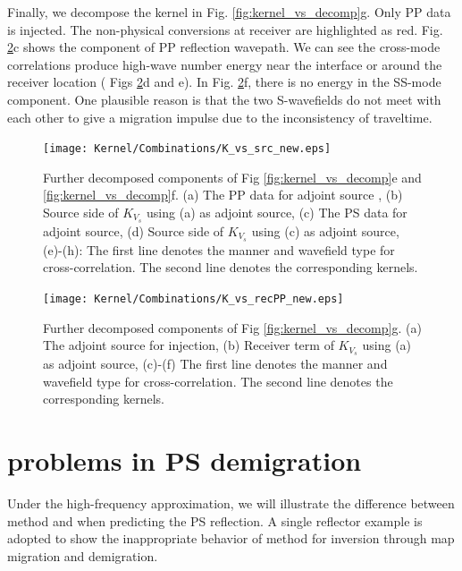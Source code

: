 \documentclass[extra,mreferee]{gji}
\newcommand{\Rome}[1]{{\bf\uppercase\expandafter{\romannumeral #1\relax}}}
\begin{document}
Finally, we decompose the kernel in Fig. \ref{fig:kernel_vs_decomp}g.
Only PP data is injected. The non-physical conversions at receiver are highlighted as red. 
Fig. \ref{fig:kernel_vs_recPP}c shows the component of PP reflection wavepath.
We can see the cross-mode correlations produce high-wave number energy near the interface or around the
receiver location ( Figs \ref{fig:kernel_vs_recPP}d and e).
In Fig. \ref{fig:kernel_vs_recPP}f,
there is no energy in the SS-mode component. One plausible reason is that the two S-wavefields do
not meet with each other to give a migration impulse due to the inconsistency of traveltime. 
\begin{figure}[!htb]
   \centering
   {\texttt{[image: Kernel/Combinations/K\_vs\_src\_new.eps]}}
   \caption{
   Further decomposed components of Fig \ref{fig:kernel_vs_decomp}e and
   \ref{fig:kernel_vs_decomp}f. (a) The PP data for adjoint source
   , (b) Source side of $K_{V_s}$ using (a) as adjoint source, 
   (c) The PS data for adjoint source,
   (d) Source side of $K_{V_s}$ using (c) as adjoint source, 
   (e)-(h): 
   The first line denotes the manner and wavefield type for cross-correlation.
   The second line denotes the corresponding kernels.
   }
   \label{fig:kernel_vs_src}
\end{figure}
\begin{figure}[!htb]
   \centering
   {\texttt{[image: Kernel/Combinations/K\_vs\_recPP\_new.eps]}}
   \caption{Further decomposed components of Fig \ref{fig:kernel_vs_decomp}g. (a) The adjoint source
   for injection, (b) Receiver term of $K_{V_s}$ using (a) as adjoint source, (c)-(f) 
   The first line denotes the manner and wavefield type for cross-correlation.
   The second line denotes the corresponding kernels.
   }
   \label{fig:kernel_vs_recPP}
\end{figure}
\section{problems in PS demigration}
Under the high-frequency approximation, we will illustrate the difference between method
\Rome{1} and \Rome{2} when
predicting the PS reflection.
A single reflector example is adopted to show the inappropriate behavior of method
\Rome{1} for inversion through 
map migration and demigration.

\end{document}
